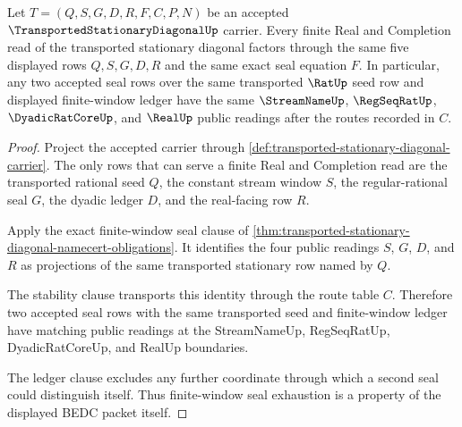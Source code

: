 \begin{theorem}
\label{thm:transported-stationary-diagonal-window-seal-exhaustion}
Let $T=(Q,S,G,D,R,F,C,P,N)$ be an accepted $\TransportedStationaryDiagonalUp$ carrier. Every finite Real and Completion read of the transported stationary diagonal factors through the same five displayed rows $Q,S,G,D,R$ and the same exact seal equation $F$. In particular, any two accepted seal rows over the same transported $\RatUp$ seed row and displayed finite-window ledger have the same $\StreamNameUp$, $\RegSeqRatUp$, $\DyadicRatCoreUp$, and $\RealUp$ public readings after the routes recorded in $C$.
\end{theorem}
\begin{proof}
Project the accepted carrier through \autoref{def:transported-stationary-diagonal-carrier}. The only rows that can serve a finite Real and Completion read are the transported rational seed $Q$, the constant stream window $S$, the regular-rational seal $G$, the dyadic ledger $D$, and the real-facing row $R$.

Apply the exact finite-window seal clause of \autoref{thm:transported-stationary-diagonal-namecert-obligations}. It identifies the four public readings $S$, $G$, $D$, and $R$ as projections of the same transported stationary row named by $Q$.

The stability clause transports this identity through the route table $C$. Therefore two accepted seal rows with the same transported seed and finite-window ledger have matching public readings at the StreamNameUp, RegSeqRatUp, DyadicRatCoreUp, and RealUp boundaries.

The ledger clause excludes any further coordinate through which a second seal could distinguish itself. Thus finite-window seal exhaustion is a property of the displayed BEDC packet itself.
\end{proof}

